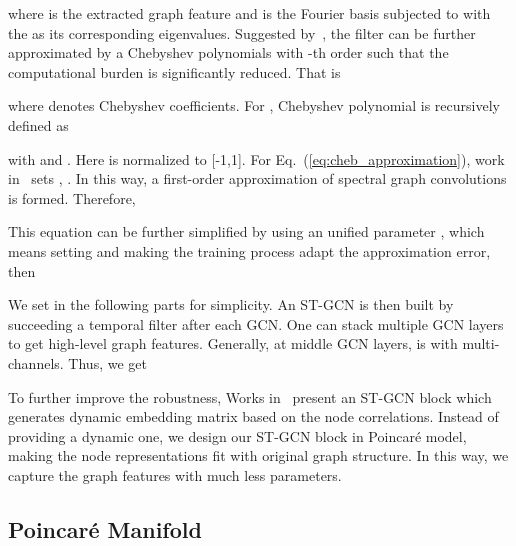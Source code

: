 \documentclass[letterpaper]{article} \usepackage{aaai19}  \usepackage{times}  \usepackage{helvet} \usepackage{courier}  \usepackage[hyphens]{url}  \usepackage{graphicx} \urlstyle{rm} \def\UrlFont{\rm}  \usepackage{graphicx}  \frenchspacing  \setlength{\pdfpagewidth}{8.5in}  \setlength{\pdfpageheight}{11in}
\begin{document}
\noindent where  is the extracted graph feature and  is the Fourier basis subjected to  with the  as its corresponding eigenvalues. Suggested by~\cite{hammond2011wavelets}, the filter  can be further approximated by a Chebyshev polynomials with -th order such that the computational burden is significantly reduced. That is


\noindent where  denotes Chebyshev coefficients. For , Chebyshev polynomial  is recursively defined as

with  and . Here  is normalized to [-1,1]. For Eq.~(\ref{eq:cheb_approximation}), work in~\cite{kipf2016semi} sets , . In this way, a first-order approximation of spectral graph convolutions is formed. Therefore, 


\noindent This equation can be further simplified by using an unified parameter , which means setting  and making the training process adapt the approximation error, then 

We set   in the following parts for simplicity. An ST-GCN is then built by succeeding a temporal filter after each GCN. One can stack multiple GCN layers to get high-level graph features. Generally, at middle GCN layers,  is with multi-channels. Thus, we get


To further improve the robustness, Works in~\cite{shi2019two,peng2020learning} present an ST-GCN block which generates dynamic embedding matrix based on the node correlations.  Instead of providing a dynamic one, we design our ST-GCN block in Poincar\'e model, making the node representations fit with original graph structure. In this way, we capture the graph features with much less parameters.

\subsection{Poincar\'e Manifold}
\end{document}
